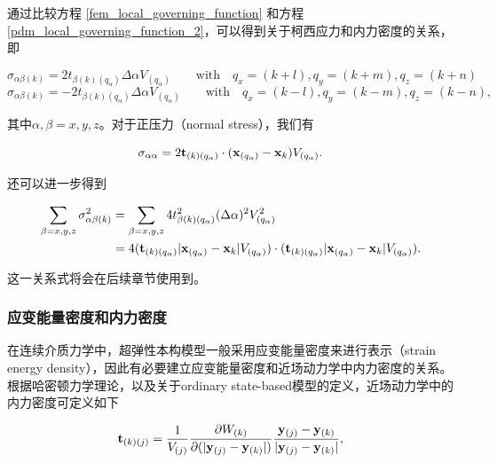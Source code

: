 通过比较方程 \ref{fem_local_governing_function} 和方程 \ref{pdm_local_governing_function_2}，可以得到关于柯西应力和内力密度的关系，即

\begin{equation}
\sigma_{\alpha\beta(k)} = 2t_{\beta(k)(q_\alpha)}\Delta\alpha V_{(q_\alpha)}\qquad \mathrm{with } \quad q_x=(k+l),q_y=(k+m),q_z=(k+n)
\label{eq:7}
\end{equation}
\begin{equation}
\sigma_{\alpha\beta(k)} = -2t_{\beta(k)(q_\alpha)}\Delta\alpha V_{(q_\alpha)}\qquad \mathrm{with } \quad q_x=(k-l),q_y=(k-m),q_z=(k-n),
\label{eq:8}
\end{equation}

其中$\alpha,\beta=x,y,z$。对于正压力（normal stress），我们有

\begin{equation}
\sigma_{\alpha\alpha} = 2 \mathbf{t}_{(k)(q_\alpha)}\cdot(\mathbf{x}_{(q_\alpha)}-\mathbf{x}_{k})V_{(q_\alpha)}.
\label{eq:9}
\end{equation}

还可以进一步得到

\begin{equation}
\begin{aligned}
\sum_{\beta=x,y,z}\sigma_{\alpha\beta(k)}^2 &= \sum_{\beta=x,y,z}4t_{\beta(k)(q_\alpha)}^2(\Delta\alpha)^2 V_{(q_\alpha)}^2 \\
                                            &= 4(\mathbf{t}_{(k)(q_\alpha)}|\mathbf{x}_{(q_\alpha)}-\mathbf{x}_{k}|V_{(q_\alpha)})
                                                 \cdot
                                                (\mathbf{t}_{(k)(q_\alpha)}|\mathbf{x}_{(q_\alpha)}-\mathbf{x}_{k}|V_{(q_\alpha)}).
\end{aligned}
\label{eq:10}
\end{equation}

这一关系式将会在后续章节使用到。

\subsubsection{应变能量密度和内力密度}
在连续介质力学中，超弹性本构模型一般采用应变能量密度来进行表示（strain energy density），因此有必要建立应变能量密度和近场动力学中内力密度的关系。根据哈密顿力学理论，以及关于ordinary state-based模型的定义，近场动力学中的内力密度可定义如下

\begin{equation}
\mathbf{t}_{(k)(j)}=\frac{1}{V_{(j)}}\frac{\partial W_{(k)}}{\partial (|\mathbf{y}_{(j)}-\mathbf{y}_{(k)}|)}\frac{\mathbf{y}_{(j)}-\mathbf{y}_{(k)}}{|\mathbf{y}_{(j)}-\mathbf{y}_{(k)}|},
\label{eq:11}
\end{equation}

